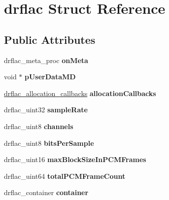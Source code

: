 \hypertarget{structdrflac}{}\section{drflac Struct Reference}
\label{structdrflac}
\subsection*{Public Attributes}
\begin{DoxyCompactItemize}
\item 
\mbox{\label{structdrflac_a6c558b33c91a829405d01cb1a49559af}} 
drflac\+\_\+meta\+\_\+proc {\bfseries on\+Meta}
\item 
\mbox{\label{structdrflac_a583eb657fbec8f84a1e88753c6f39de2}} 
void $\ast$ {\bfseries p\+User\+Data\+MD}
\item 
\mbox{\label{structdrflac_acbb32ceb21a3d676f585763c7523c868}} 
\mbox{\hyperlink{structdrflac__allocation__callbacks}{drflac\+\_\+allocation\+\_\+callbacks}} {\bfseries allocation\+Callbacks}
\item 
\mbox{\label{structdrflac_ad2556454adc48659e9f15d9b2eb53993}} 
drflac\+\_\+uint32 {\bfseries sample\+Rate}
\item 
\mbox{\label{structdrflac_a6e016a68a3187aab1af97fe7d2719f6d}} 
drflac\+\_\+uint8 {\bfseries channels}
\item 
\mbox{\label{structdrflac_a7171edaabeda9c472d5a9329d7f32fcc}} 
drflac\+\_\+uint8 {\bfseries bits\+Per\+Sample}
\item 
\mbox{\label{structdrflac_a87b16d0a16ac9f92901786116c9abd1f}} 
drflac\+\_\+uint16 {\bfseries max\+Block\+Size\+In\+P\+C\+M\+Frames}
\item 
\mbox{\label{structdrflac_a928a3033601ed8e6e4bcdd5ffdd0d5b4}} 
drflac\+\_\+uint64 {\bfseries total\+P\+C\+M\+Frame\+Count}
\item 
\mbox{\label{structdrflac_afa8e720fd607f10a1b6d0aa52426b062}} 
drflac\+\_\+container {\bfseries container}
\item 

\end{DoxyCompactItemize}
